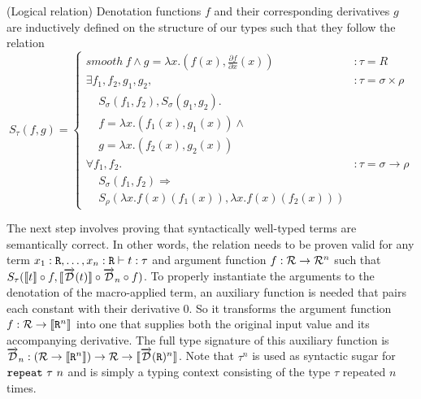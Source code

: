   \begin{definition}(Logical relation)
    Denotation functions $f$ and their corresponding derivatives $g$ are inductively defined on the structure of our types such that they follow the relation
    \begin{equation}
      S_\tau(f, g) =
        \left\{
          \begin{array}{ll}
            smooth\ f \wedge
              g = \lambda x. (f(x), \frac{\partial f}{\partial x}(x))
              & : \tau = R \\
            \exists f_1, f_2, g_1, g_2,
              & : \tau = \sigma \times \rho \\
              \;\;\;\;S_\sigma(f_1, f_2), S_\sigma(g_1, g_2). \\
              \;\;\;\;f = \lambda x. (f_1(x), g_1(x)) \wedge \\
              \;\;\;\;g = \lambda x. (f_2(x), g_2(x)) \\
            \forall f_1, f_2.
              & : \tau = \sigma \rightarrow \rho \\
              \;\;\;\;S_\sigma(f_1, f_2) \Rightarrow \\
              \;\;\;\;S_\rho(\lambda x. f(x)(f_1(x)),\lambda x. f(x)(f_2(x)))
          \end{array}
        \right.
    \label{eqn:lr_base}
    \end{equation}
  \end{definition}

  The next step involves proving that syntactically well-typed terms are semantically correct.
  In other words, the relation needs to be proven valid for any term $x_1 : \texttt{R}, \dots, x_n : \texttt{R} \vdash t : \tau$ and argument function $f : \mathcal{R} \rightarrow \mathcal{R}^n$ such that $S_\tau(\llbracket t \rrbracket \circ f, \llbracket \overrightarrow{\mathcal{D}}(t) \rrbracket \circ \overrightarrow{\mathcal{D}}_n \circ f)$.
  To properly instantiate the arguments to the denotation of the macro-applied term, an auxiliary function is needed that pairs each constant with their derivative $0$. So it transforms the argument function $f : \mathcal{R} \rightarrow \llbracket \texttt{R}^n \rrbracket$ into one that supplies both the original input value and its accompanying derivative.
  The full type signature of this auxiliary function is $\overrightarrow{\mathcal{D}}_n : (\mathcal{R} \rightarrow \llbracket \texttt{R}^n \rrbracket) \rightarrow \mathcal{R} \rightarrow \llbracket \overrightarrow{\mathcal{D}}(\texttt{R})^n \rrbracket$. Note that $\tau^n$ is used as syntactic sugar for $\texttt{repeat}\ \tau\ n$ and is simply a typing context consisting of the type $\tau$ repeated $n$ times.

